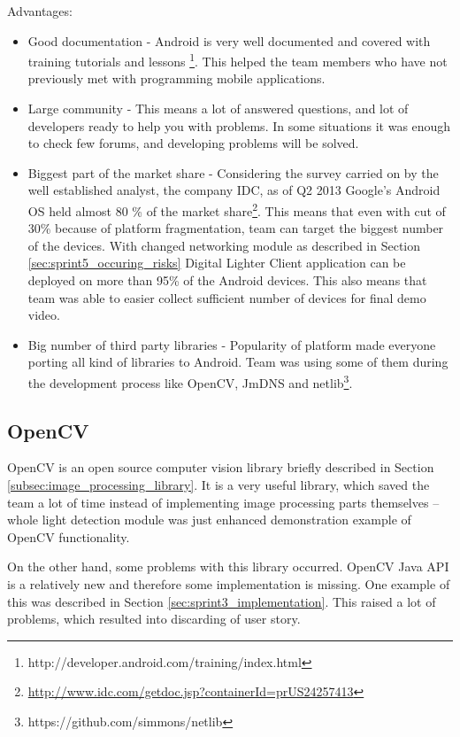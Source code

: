 Advantages:
\begin{itemize}
\item Good documentation - Android is very well documented and covered with training tutorials and lessons \footnote{http://developer.android.com/training/index.html}. This helped the team members who have not previously met with programming mobile applications. 

\item Large community - This means a lot of answered questions, and lot of developers ready to help you with problems. In some situations it was enough to check few forums, and developing problems will be solved.

\item Biggest part of the market share - Considering the survey carried on by the well established analyst, the company IDC, as of Q2 2013 Google's Android OS held almost 80 \% of the market share\footnote{\url{http://www.idc.com/getdoc.jsp?containerId=prUS24257413}}. This means that even with cut of 30\% because of platform fragmentation, team can target the biggest number of the devices. With changed networking module as described in Section \ref{sec:sprint5_occuring_risks} Digital Lighter Client application can be deployed on more than 95\% of the Android devices. This also means that team was able to easier collect sufficient number of devices for final demo video.

\item Big number of third party libraries - Popularity of platform made everyone porting all kind of libraries to Android. Team was using some of them during the development process like OpenCV, JmDNS and netlib\footnote{https://github.com/simmons/netlib}. 
\end{itemize}

\subsection{OpenCV} \label{subsec:openCV_reflection}

OpenCV is an open source computer vision library briefly described in Section \ref{subsec:image_processing_library}.
It is a very useful library, which saved the team a lot of time instead of implementing image processing parts themselves
 -- whole light detection module was just enhanced demonstration example of OpenCV functionality.

On the other hand, some problems with this library occurred.
OpenCV Java API is a relatively new and therefore some implementation is missing.
One example of this was described in Section \ref{sec:sprint3_implementation}.
This raised a lot of problems, which resulted into discarding of user story.

